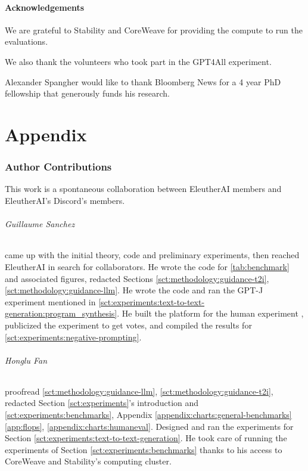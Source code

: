 \documentclass{article}
\begin{document}
\subsection*{Acknowledgements}

We are grateful to Stability and CoreWeave for providing the compute to run the evaluations.

We also thank the volunteers who took part in the GPT4All experiment.

Alexander Spangher would like to thank Bloomberg News for a 4 year PhD fellowship that generously funds his research.



\newpage
\appendix
{} \part{Appendix} \parttoc 


\section{Author Contributions}

This work is a spontaneous collaboration between EleutherAI members and EleutherAI's Discord's members.

\paragraph{Guillaume Sanchez} came up with the initial theory, code and preliminary experiments, then reached EleutherAI in search for collaborators. He wrote the code for \ref{tab:benchmark} and associated figures, redacted Sections \ref{sct:methodology:guidance-t2i}, \ref{sct:methodology:guidance-llm}. He wrote the code and ran the GPT-J experiment mentioned in \ref{sct:experiments:text-to-text-generation:program_synthesis}.
He built the platform for the human experiment , publicized the experiment to get votes, and compiled the results for \ref{sct:experiments:negative-prompting}.

\paragraph{Honglu Fan} proofread \ref{sct:methodology:guidance-llm}, \ref{sct:methodology:guidance-t2i}, redacted Section \ref{sct:experiments}'s introduction and \ref{sct:experiments:benchmarks}, Appendix \ref{appendix:charts:general-benchmarks}\ref{app:flops}, \ref{appendix:charts:humaneval}. Designed and ran the experiments for Section \ref{sct:experiments:text-to-text-generation}. He took care of running the experiments of Section \ref{sct:experiments:benchmarks} thanks to his access to CoreWeave and Stability's computing cluster.
\end{document}
